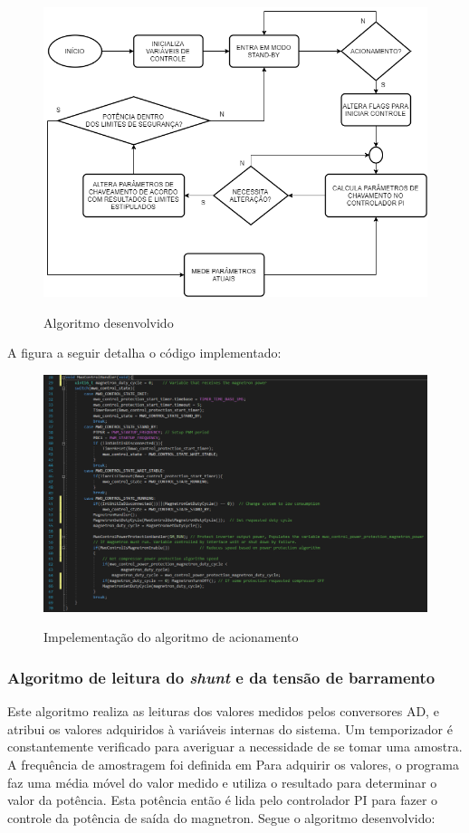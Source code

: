 \begin{figure}[H]
    \centering
    \caption{Algoritmo desenvolvido}
    \includegraphics[width=1\textwidth]{./dados/figuras/mwo_flow}
    \label{fig:figura-mwo_flow}
\end{figure}

A figura a seguir detalha o código implementado:

\begin{figure}[H]
    \centering
    \caption{Impelementação do algoritmo de acionamento}
    \includegraphics[width=1\textwidth]{./dados/figuras/func_mwo}
    \label{fig:figura-func_mwo}
\end{figure}

\subsubsection{Algoritmo de leitura do \textit{shunt} e da tensão de barramento}
Este algoritmo realiza as leituras dos valores medidos pelos conversores AD, e atribui os valores adquiridos à variáveis internas do sistema. Um temporizador é constantemente verificado para averiguar a necessidade de se tomar uma amostra. A frequência de amostragem foi definida em  Para adquirir os valores, o programa faz uma média móvel do valor medido e utiliza o resultado para determinar o valor da potência. Esta potência então é lida pelo controlador PI para fazer o controle da potência de saída do magnetron. Segue o algoritmo desenvolvido:

